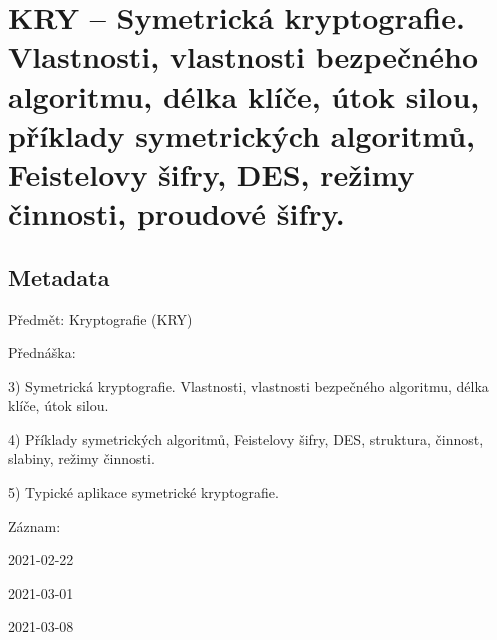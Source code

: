 

\graphicspath{{kry/symetricka_kryptografie/figures}}


\chapter{KRY -- Symetrická kryptografie. Vlastnosti, vlastnosti bezpečného algoritmu, délka klíče, útok silou, příklady symetrických algoritmů, Feistelovy šifry, DES, režimy činnosti, proudové šifry.}



\section{Metadata}

\begin{compactitem}
    \item Předmět: Kryptografie (KRY)
    \item Přednáška:
    \begin{compactitem}
        \item 3) Symetrická kryptografie. Vlastnosti, vlastnosti bezpečného algoritmu, délka klíče, útok silou.
        \item 4) Příklady symetrických algoritmů, Feistelovy šifry, DES, struktura, činnost, slabiny, režimy činnosti.
        \item 5) Typické aplikace symetrické kryptografie.
    \end{compactitem}
    \item Záznam:
    \begin{compactitem}
        \item 2021-02-22
        \item 2021-03-01
        \item 2021-03-08
    \end{compactitem}
\end{compactitem}


